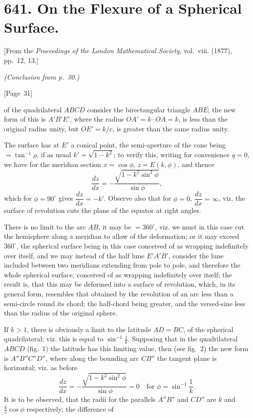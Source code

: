 \documentclass[11pt,a4paper]{book}
\begin{document}
\newpage
\section*{641. On the Flexure of a Spherical Surface.}

[From the \textit{Proceedings of the London Mathematical Society}, vol.~viii. (1877),
pp.~12, 13.]

\textit{(Conclusion from p.~30.)}

\begin{center}
[Page~31]
\end{center}

of the quadrilateral $ABCD$ consider the birectangular triangle $ABE$;
the new form of this is $A'B'E'$, where the radius $OA' = k \cdot OA = k$,
is less than the original radius unity, but $OE' = k/c$, is greater than
the same radius unity.

The surface has at $E'$ a conical point, the semi-aperture of the cone
being $= \tan^{-1} \rho$, if as usual $k' = \sqrt{1-k^2}$;
to verify this, writing for convenience $q=0$, we have for the meridian
section $x = \cos\phi$, $z = E(k,\phi)$, and thence
\[
\frac{dz}{dx} = -\frac{\sqrt{1-k^2\sin^2\phi}}{\sin\phi},
\]
which for $\phi = 90^\circ$ gives $\dfrac{dz}{dx} = -k'$.
Observe also that for $\phi = 0$, $\dfrac{dz}{dx} = \infty$,
viz. the surface of revolution cuts the plane of the equator at right angles.

There is no limit to the arc $AB$, it may be $= 360^\circ$,
viz. we must in this case cut the hemisphere along a meridian to allow of
the deformation; or it may exceed $360^\circ$, the spherical surface being in
this case conceived of as wrapping indefinitely over itself, and we may
instead of the half lune $E'A'B'$, consider the lune included between
two meridians extending from pole to pole, and therefore the whole
spherical surface, conceived of as wrapping indefinitely over itself;
the result is, that this may be deformed into a surface of revolution,
which, in its general form, resembles that obtained by the revolution of
an arc less than a semi-circle round its chord; the half-chord being
greater, and the versed-sine less than the radius of the original sphere.

If $k > 1$, there is obviously a limit to the latitude
$AD = BC$, of the spherical quadrilateral; viz. this is equal to
$\sin^{-1}\tfrac{1}{k}$.
Supposing that in the quadrilateral $ABCD$ (fig.~1) the latitude has
this limiting value, then (see fig.~2) the new form is $A''B''C''D''$,
where along the bounding arc $C B''$ the tangent plane is horizontal;
viz. as before
\[
\frac{dz}{dx} = -\frac{\sqrt{1-k^2\sin^2\phi}}{\sin\phi} = 0
\quad \text{for } \phi = \sin^{-1}\frac{1}{k}.
\]
It is to be observed, that the radii for the parallels $A''B''$ and
$C D''$ are $k$ and $\tfrac{k}{c}\cos\phi$ respectively; the difference of
\end{document}
